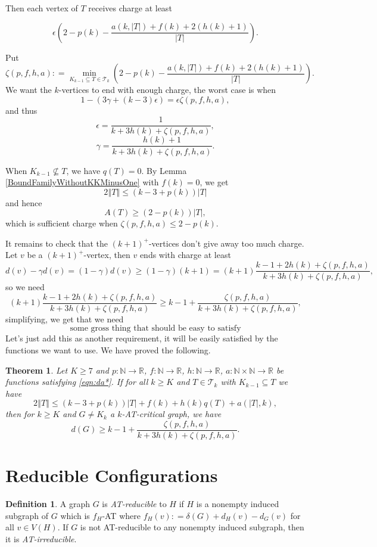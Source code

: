 \documentclass[12pt]{article}
\theoremstyle{plain}
\newtheorem{thm}{Theorem}[section]
\theoremstyle{definition}
\newtheorem{defn}{Definition}
\theoremstyle{remark}
\newcommand{\fancy}[1]{\mathcal{#1}}
\newcommand{\IN}{\mathbb{N}}
\newcommand{\IR}{\mathbb{R}}
\newcommand{\T}{\fancy{T}}
\newcommand{\card}[1]{\left|#1\right|}
\newcommand{\size}[1]{\left\Vert#1\right\Vert}
\newcommand{\func}[3]{#1\colon #2 \rightarrow #3}
\newcommand{\parens}[1]{\left( #1 \right)}
\newcommand{\DefinedAs}{\mathrel{\mathop:}=}
\begin{document}
Then each vertex of $T$ receives charge at least

\[\epsilon\parens{2-p(k) - \frac{a(k, |T|) + f(k) + 2(h(k) + 1)}{|T|}} .\]

Put 
\[\zeta(p,f,h,a) \DefinedAs \min_{K_{k-1} \subseteq T \in \T_k} \parens{2-p(k) - \frac{a(k, |T|) + f(k) + 2(h(k) + 1)}{|T|}}.\]
We want the $k$-vertices to end with enough charge, the worst case is when
\[1 - (3\gamma + (k-3)\epsilon) = \epsilon\zeta(p,f,h,a),\]
and thus
\[\epsilon = \frac{1}{k+3h(k) + \zeta(p,f,h,a)},\]
\[\gamma = \frac{h(k)+1}{k+3h(k) + \zeta(p,f,h,a)}.\]

When $K_{k-1} \not \subseteq T$, we have $q(T) = 0$.  By Lemma \ref{BoundFamilyWithoutKKMinusOne} with $f(k) = 0$, we get 
\[2\size{T} \le (k-3 + p(k))\card{T}\]
and hence
\[A(T) \ge (2-p(k))\card{T},\]
which is sufficient charge when $\zeta(p,f,h,a) \le 2 - p(k)$.

It remains to check that the $(k+1)^+$-vertices don't give away too much charge.  Let $v$ be a $(k+1)^+$-vertex, then $v$ ends with charge at least
\[d(v) - \gamma d(v) = (1-\gamma)d(v) \ge (1-\gamma)(k+1) = (k+1) \frac{k - 1 + 2h(k) + \zeta(p,f,h,a)}{k+3h(k) + \zeta(p,f,h,a)},\]
so we need
\[(k+1) \frac{k - 1 + 2h(k) + \zeta(p,f,h,a)}{k+3h(k) + \zeta(p,f,h,a)} \ge k-1 + \frac{\zeta(p,f,h,a)}{k+3h(k) + \zeta(p,f,h,a)},\]
simplifying, we get that we need
\[\text{some gross thing that should be easy to satisfy}\tag{*}\label{eqn:da*}\]
Let's just add this as another requirement, it will be easily satisfied by the functions we want to use.  We have proved the following.

\begin{thm}\label{UberTheorem2}
	Let $K \ge 7$ and $\func{p}{\IN}{\IR}$, $\func{f}{\IN}{\IR}$, $\func{h}{\IN}{\IR}$, $\func{a}{\IN \times \IN}{\IR}$ be functions satisfying \ref{eqn:da*}.
    If for all $k \ge K$ and $T \in \T_k$ with $K_{k-1} \subseteq T$ we have
	\[2\size{T} \le (k-3 + p(k))\card{T} + f(k) + h(k)q(T) + a(|T|, k),\]
	then for $k \ge K$ and $G \ne K_k$ a $k$-AT-critical graph, we have
	\[d(G) \ge k-1 + \frac{\zeta(p,f,h,a)}{k+3h(k) + \zeta(p,f,h,a)}.\]
\end{thm}


\section{Reducible Configurations}
\begin{defn}
	A graph $G$ is \emph{AT-reducible} to $H$ if $H$ is a nonempty induced subgraph of $G$ which is $f_H$-AT where $f_H(v) \DefinedAs \delta(G) + d_H(v) - d_G(v)$ for all $v \in V(H)$.  
	If $G$ is not AT-reducible to any nonempty induced subgraph, then it is \emph{AT-irreducible}.
\end{defn}
\end{document}
